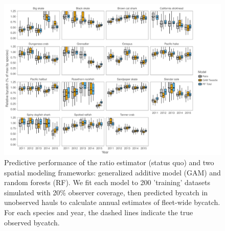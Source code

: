 \documentclass[]{article}
\begin{document}
\begin{landscape}
\begin{figure}

{\centering \includegraphics[width=10in]{bycatch_sim_paper_files/figure-latex/model-comparison-byyear-catch-1} 

}

\caption{Predictive performance of the ratio estimator (status quo) and two spatial modeling frameworks: generalized additive model (GAM) and random forests (RF). We fit each model to 200 'training' datasets simulated with 20\% observer coverage, then predicted bycatch in unobserved hauls to calculate annual estimates of fleet-wide bycatch. For each species and year, the dashed lines indicate the true observed bycatch.}\label{fig:model-comparison-byyear-catch}
\end{figure}
\end{landscape}

\pagebreak
\end{document}
